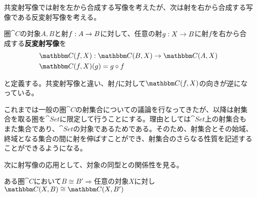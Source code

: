   共変射写像では射を左から合成する写像を考えたが、次は射を右から合成する写像である反変射写像を考える。

	\begin{define}[反変射写像]
		圏$\cat{C}$の対象$A,B$と射$f:A\rightarrow B$に対して、任意の射$g:X\rightarrow B$に射$f$を右から合成する\textbf{反変射写像}を
		\begin{align*}
			&\mor{\arset{C}{f}{X}}{\arset{C}{B}{X}}{\arset{C}{A}{X}}\\
			&\arset{C}{f}{X}(g)=g\circ f
		\end{align*}
		\begin{center}
		\end{center}
		と定義する。共変射写像と違い、射$f$に対して$\arset{C}{f}{X}$の向きが逆になっている。
	\end{define}

  これまでは一般の圏$\cat{C}$の射集合についての議論を行なってきたが、以降は射集合を取る圏を$\cat{Set}$に限定して行うことにする。理由としては$\cat{Set}$上の射集合もまた集合であり、$\cat{Set}$の対象であるためである。そのため、射集合とその始域、終域となる集合の間に射を伸ばすことができ、射集合のさらなる性質を記述することができるようになる。

  次に射写像の応用として、対象の同型との関係性を見る。

  \begin{prop}[同型射となる共変射写像]ある圏$\cat{C}$において$B\cong B'\Longrightarrow$任意の対象$X$に対し$\arset{C}{X}{B}\cong\arset{C}{X}{B'}$
  \end{prop}

